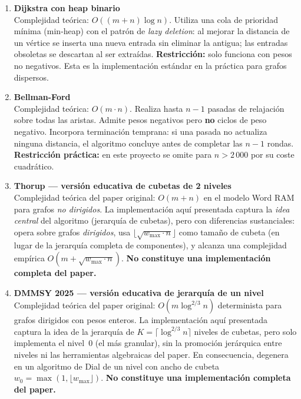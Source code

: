 \begin{enumerate}[leftmargin=*, label=\textbf{\arabic{enumi}.}]

  \item \textbf{Dijkstra con heap binario}~\cite{dijkstra1959, johnson1977}\\
    Complejidad teórica: $O((m + n)\log n)$.
    Utiliza una cola de prioridad mínima (min-heap) con el patrón de
    \textit{lazy deletion}: al mejorar la distancia de un vértice se inserta
    una nueva entrada sin eliminar la antigua; las entradas obsoletas se
    descartan al ser extraídas.
    \textbf{Restricción:} solo funciona con pesos no negativos.
    Esta es la implementación estándar en la práctica para grafos dispersos.

  \item \textbf{Bellman-Ford}~\cite{bellman1958, ford1956}\\
    Complejidad teórica: $O(m \cdot n)$.
    Realiza hasta $n-1$ pasadas de relajación sobre todas las aristas.
    Admite pesos negativos pero \textbf{no} ciclos de peso negativo.
    Incorpora terminación temprana: si una pasada no actualiza ninguna
    distancia, el algoritmo concluye antes de completar las $n-1$ rondas.
    \textbf{Restricción práctica:} en este proyecto se omite para $n > 2\,000$
    por su coste cuadrático.

  \item \textbf{Thorup — versión educativa de cubetas de 2 niveles}~\cite{thorup1999}\\
    Complejidad teórica del paper original: $O(m + n)$ en el modelo Word RAM
    para grafos \emph{no dirigidos}.
    La implementación aquí presentada captura la \textit{idea central} del
    algoritmo (jerarquía de cubetas), pero con diferencias sustanciales:
    opera sobre grafos \emph{dirigidos}, usa $\lfloor\sqrt{w_{\max}\cdot n}\rfloor$
    como tamaño de cubeta (en lugar de la jerarquía completa de componentes),
    y alcanza una complejidad empírica $O(m + \sqrt{w_{\max}\cdot n})$.
    \textbf{No constituye una implementación completa del paper.}

  \item \textbf{DMMSY 2025 — versión educativa de jerarquía de un nivel}~\cite{duan2025}\\
    Complejidad teórica del paper original: $O(m\log^{2/3} n)$ determinista
    para grafos dirigidos con pesos enteros.
    La implementación aquí presentada captura la idea de la jerarquía de
    $K = \lceil\log^{2/3} n\rceil$ niveles de cubetas, pero solo implementa
    el nivel~0 (el más granular), sin la promoción jerárquica entre niveles
    ni las herramientas algebraicas del paper.
    En consecuencia, degenera en un algoritmo de Dial de un nivel con ancho
    de cubeta $w_0 = \max(1, \lfloor w_{\max}\rfloor)$.
    \textbf{No constituye una implementación completa del paper.}

\end{enumerate}

